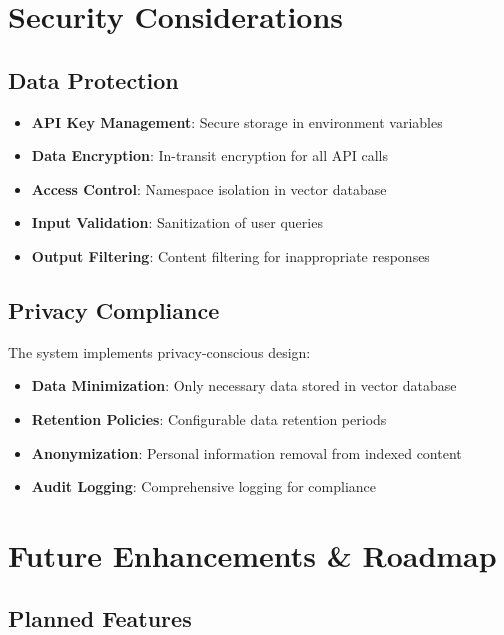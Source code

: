 \documentclass[12pt,a4paper]{article}
\begin{document}
\section{Security Considerations}

\subsection{Data Protection}

\begin{itemize}
    \item \textbf{API Key Management}: Secure storage in environment variables
    \item \textbf{Data Encryption}: In-transit encryption for all API calls
    \item \textbf{Access Control}: Namespace isolation in vector database
    \item \textbf{Input Validation}: Sanitization of user queries
    \item \textbf{Output Filtering}: Content filtering for inappropriate responses
\end{itemize}

\subsection{Privacy Compliance}

The system implements privacy-conscious design:

\begin{itemize}
    \item \textbf{Data Minimization}: Only necessary data stored in vector database
    \item \textbf{Retention Policies}: Configurable data retention periods
    \item \textbf{Anonymization}: Personal information removal from indexed content
    \item \textbf{Audit Logging}: Comprehensive logging for compliance
\end{itemize}

\section{Future Enhancements \& Roadmap}

\subsection{Planned Features}
\end{document}
